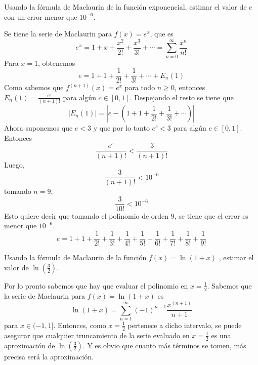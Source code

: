 \documentclass{article}
\begin{document}
\begin{example}{2}
    Usando la fórmula de Maclaurin de la función exponencial, estimar el valor de $e$ con un error menor que $10^{-6}$.
\end{example}
Se tiene la serie de Maclaurin para $f(x) = e^x$, que es
\begin{equation*}
    e^x = 1 + x + \frac{x^2}{2!} + \frac{x^3}{3!} + \cdots = \sum_{n=0}^{\infty} \frac{x^n}{n!}
\end{equation*}
Para $x=1$, obtenemos
\begin{equation*}
    e = 1 + 1 + \frac{1}{2!} + \frac{1}{3!} + \cdots + E_n(1)
\end{equation*}
Como sabemos que $f^{(n+1)}(x) = e^x$ para todo $n\geq 0$, entonces $E_n(1) = \frac{e^c}{(n+1)!}$ para algún $c\in [0,1]$.
Despejando el resto se tiene que
\begin{equation*}
   | E_n(1) | = \left | e - \left(1 + 1 + \frac{1}{2!} + \frac{1}{3!} + \cdots\right) \right |
\end{equation*}
Ahora suponemos que $e<3$ y que por lo tanto $e^c<3$ para algún $c\in [0,1]$. Entonces
\begin{equation*}
    \frac{e^c}{(n+1)!} < \frac{3}{(n+1)!}
\end{equation*}
Luego,
\begin{equation*}
    \frac{3}{(n+1)!} < 10^{-6}
\end{equation*}
tomando $n=9$, 
\begin{equation*}
    \frac{3}{10!} < 10^{-6}
\end{equation*}
Esto quiere decir que tomando el polinomio de orden $9$, se tiene que el error es menor que $10^{-6}$.
\begin{equation*}
    e = 1 + 1 + \frac{1}{2!} + \frac{1}{3!} + \frac{1}{4!} + \frac{1}{5!} + \frac{1}{6!} + \frac{1}{7!} + \frac{1}{8!} + \frac{1}{9!}
\end{equation*}

\begin{example}{3}
    Usando la fórmula de Maclaurin de la función $f(x)=\ln(1+x)$ , estimar el valor de $\ln(\frac{3}{2})$.
\end{example}
Por lo pronto sabemos que hay que evaluar el polinomio en $x=\frac{1}{2}$. Sabemos que la serie de Maclaurin para $f(x) = \ln(1+x)$ es
\begin{equation*}
    \ln(1+x) = \sum_{n=1}^{\infty} (-1)^{n-1} \frac{x^{(n+1)}}{n+1}
\end{equation*}
para $x \in (-1,1]$. Entonces, como $x=\frac{1}{2}$ pertenece a dicho intervalo, se puede asegurar que cualquier truncamiento de la serie evaluado en $x=\frac{1}{2}$ es una aproximación de $\ln(\frac{3}{2})$. Y es obvio que cuanto más términos se tomen, más precisa será la aproximación. 
\end{document}
